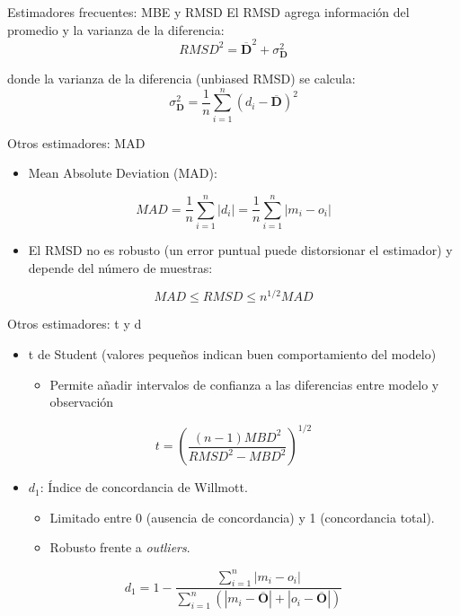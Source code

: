 \documentclass[aspectratio=169, usenames,svgnames,dvipsnames]{beamer}
\begin{document}
\begin{frame}[label={sec:orgf0291c9}]{Estimadores frecuentes: MBE y RMSD}
El RMSD agrega información del promedio y la varianza de la
  diferencia:
\[
RMSD^2= \overline{\mathbf{D}}^2 + \sigma^2_{\mathbf{D}} 
\]

donde la varianza de la diferencia (unbiased RMSD) se calcula:
\[
\sigma^2_{\mathbf{D}} = \frac{1}{n} \sum_{i=1}^n (d_i - \overline{\mathbf{D}})^2
\]
\end{frame}


\begin{frame}[label={sec:orgdbf2105}]{Otros estimadores: MAD}
\begin{itemize}
\item Mean Absolute Deviation (MAD):
\end{itemize}

\[
MAD = \frac{1}{n} \sum_{i=1}^n \left|d_i\right| =  \frac{1}{n} \sum_{i=1}^n \left|m_i - o_i\right|
\]
\begin{itemize}
\item El RMSD no es robusto (un error puntual puede distorsionar el estimador) y depende del número de muestras:
\end{itemize}
\[
MAD \leq RMSD \leq n^{1/2} MAD
\]

\nocite{Willmott.Matsuura.ea2009, Willmott.Matsuura2005a}
\end{frame}

\begin{frame}[label={sec:org495fb8c}]{Otros estimadores: t y d}
\begin{itemize}
\item t de Student (valores pequeños indican buen comportamiento del modelo)
\begin{itemize}
\item Permite añadir intervalos de confianza a las diferencias entre
modelo y observación
\end{itemize}
\end{itemize}

\[
t = \left ( \frac{(n-1) MBD^2}{RMSD^2 - MBD^2} \right)^{1/2}
\]

\nocite{Stone1993}


\begin{itemize}
\item \(d_1\): Índice de concordancia de Willmott.
\begin{itemize}
\item Limitado entre 0 (ausencia de concordancia) y 1 (concordancia total).
\item Robusto frente a \emph{outliers}.
\end{itemize}
\end{itemize}
\[
d_1 = 1 - \frac{\sum_{i=1}^n \left| m_i - o_i \right|}{\sum_{i=1}^n \left(
  \left| m_i - \overline{\mathbf{O}}\right| + \left| o_i -
    \overline{\mathbf{O}} \right| \right)}
\]

\nocite{Willmott.Robeson.ea2012}
\end{frame}
\end{document}
